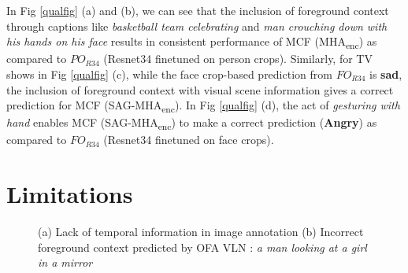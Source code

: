 In Fig \ref{qualfig} (a) and (b), we can see that the inclusion of foreground context through captions like \textit{basketball team celebrating} and \textit{man crouching down with his hands on his face} results in consistent performance of MCF (MHA\textsubscript{enc}) as compared to $PO_{R34}$ (Resnet34 finetuned on person crops). Similarly, for TV shows in Fig \ref{qualfig} (c), while the face crop-based prediction from $FO_{R34}$ is \textbf{sad}, the inclusion of foreground context with visual scene information gives a correct prediction for MCF (SAG-MHA\textsubscript{enc}). In Fig \ref{qualfig} (d), the act of \textit{gesturing with hand} enables MCF (SAG-MHA\textsubscript{enc}) to make a correct prediction (\textbf{Angry}) as compared to $FO_{R34}$ (Resnet34 finetuned on face crops).

\section{Limitations}

\begin{figure}[h!]
\centering
{}
\caption{(a) Lack of temporal information in image annotation (b) Incorrect foreground context predicted by OFA VLN \cite{wang2022ofa}: \textit{a man looking at a girl in a mirror}}
\label{temporal information and incorrect foreground}
\end{figure}

